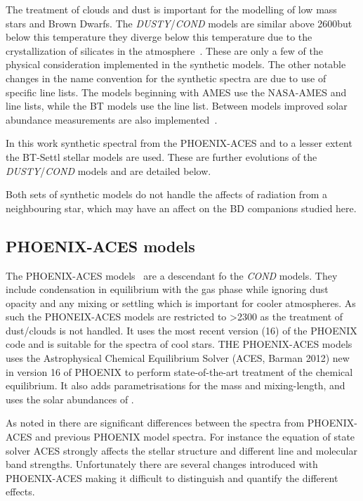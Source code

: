 The treatment of clouds and dust is important for the modelling of low mass stars and Brown Dwarfs.
The \emph{DUSTY}/\emph{COND} models are similar above 2600\K but below this temperature they diverge below this temperature due to the crystallization of silicates in the atmosphere~\citep{allard_limiting_2001}.
These are only a few of the physical consideration implemented in the synthetic models.
The other notable changes in the name convention for the synthetic spectra are due to use of specific line lists.
The models beginning with {AMES} use the {NASA-AMES}  and  line lists, while the {BT} models use the \citet{barber_highaccuracy_2006}  line list.
Between models improved solar abundance measurements are also implemented~\citep[][]{asplund_chemical_2009}.

In this work synthetic spectral from the {PHOENIX-ACES} and to a lesser extent the {BT-Settl} stellar models are used.
These are further evolutions of the \emph{DUSTY}/\emph{COND} models and are detailed below.

Both sets of synthetic models do not handle the affects of radiation from a neighbouring star, which may have an affect on the BD companions studied here.

\subsection{{PHOENIX-ACES} models}
\label{subsec:phoenix_aces}

The {PHOENIX-ACES} models~\citep{husser_new_2013} are a descendant fo the \emph{COND} models.
They include condensation in equilibrium with the gas phase while ignoring dust opacity and any mixing or settling which is important for cooler atmospheres.
As such the {PHONEIX-ACES} models are restricted to \txteff{} >2300\K{} as the treatment of dust/clouds is not handled.
It uses the most recent version (16) of the {PHOENIX} code and is suitable for the spectra of cool stars.
THE PHOENIX-ACES models uses the Astrophysical Chemical Equilibrium Solver (ACES, Barman 2012) new in version 16 of PHOENIX to perform state-of-the-art treatment of the chemical equilibrium. It also adds parametrisations for the mass and mixing-length, and uses the solar abundances of \citet{asplund_checmial_2009}.

As noted in \citep{husser_new_2013} there are significant differences between the spectra from PHOENIX-ACES and previous PHOENIX model spectra.
For instance the equation of state solver ACES strongly affects the stellar structure and different line and molecular band strengths.
Unfortunately there are several changes introduced with {PHOENIX-ACES} making it difficult to distinguish and quantify the different effects.

